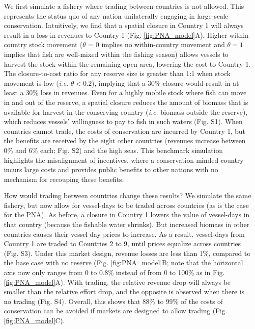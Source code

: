 \documentclass[12pt]{article}
\begin{document}
We first simulate a fishery where trading between countries is not allowed. This represents the status quo of any nation unilaterally engaging in large-scale conservation. Intuitively, we find that a spatial closure in Country 1 will always result in a loss in revenues to Country 1 (Fig. \ref{fig:PNA_model}A). Higher within-country stock movement ($\theta$ = 0 implies no within-country movement and $\theta = 1$ implies that fish are well-mixed within the fishing season) allows vessels to harvest the stock within the remaining open area, lowering the cost to Country 1. The closure-to-cost ratio for any reserve size is greater than 1:1 when stock movement is low (\emph{i.e.} $\theta < 0.2$), implying that a 30\% closure would result in at least a 30\% loss in revenues. Even for a highly mobile stock where fish can move in and out of the reserve, a spatial closure reduces the amount of biomass that is available for harvest in the conserving country (\emph{i.e.} biomass outside the reserve), which reduces vessels' willingness to pay to fish in such waters (Fig. S1). When countries cannot trade, the costs of conservation are incurred by Country 1, but the benefits are received by the eight other countries (revenues increase between 0\% and 6\% each; Fig. S2) and the high seas. This benchmark simulation highlights the misalignment of incentives, where a conservation-minded country incurs large costs and provides public benefits to other nations with no mechanism for recouping these benefits.

How would trading between countries change these results? We simulate the same fishery, but now allow for vessel-days to be traded across countries (as is the case for the PNA). As before, a closure in Country 1 lowers the value of vessel-days in that country (because the fishable water shrinks). But increased biomass in other countries causes their vessel day prices to increase. As a result, vessel-days from Country 1 are traded to Countries 2 to 9, until prices equalize across countries (Fig. S3). Under this market design, revenue losses are less than 1\%, compared to the base case with no reserve (Fig. \ref{fig:PNA_model}B; note that the horizontal axis now only ranges from 0 to 0.8\% instead of from 0 to 100\% as in Fig. \ref{fig:PNA_model}A). With trading, the relative revenue drop will always be smaller than the relative effort drop, and the opposite is observed when there is no trading (Fig. S4). Overall, this shows that 88\% to 99\% of the costs of conservation can be avoided if markets are designed to allow trading (Fig. \ref{fig:PNA_model}C).
\end{document}
